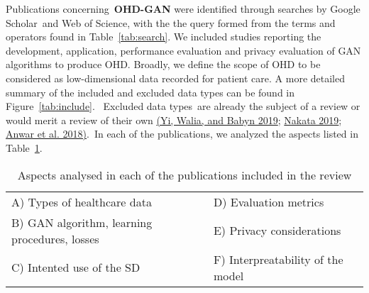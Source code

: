 \documentclass[10pt]{article}
\begin{document}
Publications concerning~\textbf{OHD-GAN} were identified through
searches by Google Scholar~and Web of Science, with the the query formed
from the terms and operators found in
Table~{\ref{tab:search}}. We included studies reporting
the development, application, performance evaluation and privacy
evaluation of GAN algorithms to produce OHD. Broadly, we define the
scope of OHD to be considered as low-dimensional data recorded for
patient care. A more detailed summary of the included and excluded data
types can be found in Figure~{\ref{tab:include}}.~
Excluded data types~are already the subject of a review or would merit a
review of their own \hyperref[csl:1]{(Yi, Walia, and Babyn 2019}; \hyperref[csl:2]{Nakata 2019}; \hyperref[csl:3]{Anwar et al. 2018)}.~In each of the publications, we
analyzed the aspects listed in
Table~{\ref{tab:aspects}}.
\begin{table}
\centering
    \caption{{Aspects analysed in each of the publications included in the review\label{tab:aspects}}}
    \begin{tabular}{ll}\toprule
    A) Types of healthcare data & D) Evaluation metrics\\
    B) GAN algorithm, learning procedures, losses & E) Privacy considerations\\
    C) Intented use of the SD & F) Interpreatability of the model\\\bottomrule
    \end{tabular}
\end{table}
\end{document}
